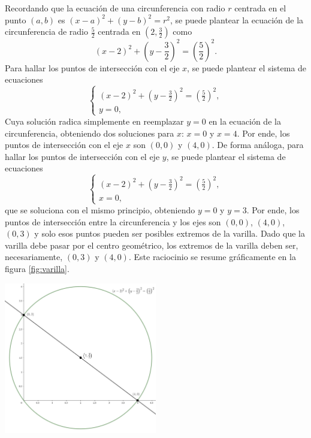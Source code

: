 \documentclass{fmbvecto}
\begin{document}
\begin{problema}
Recordando que la ecuación de una circunferencia con radio \(r\) centrada en el punto \((a, b)\) es \((x - a)^2 + (y - b)^2 = r^2\), se puede plantear la ecuación de la circunferencia de radio \(\frac{5}{2}\) centrada en \((2, \frac{3}{2})\) como
\[(x - 2)^2 + \left(y - \frac{3}{2}\right)^2 = \left(\frac{5}{2}\right)^2.\]
Para hallar los puntos de intersección con el eje \(x\), se puede plantear el sistema de ecuaciones
\[\begin{cases}
    (x - 2)^2 + \left(y - \frac{3}{2}\right)^2 = \left(\frac{5}{2}\right)^2, \\
    y = 0,
\end{cases}\]
Cuya solución radica simplemente en reemplazar \(y = 0\) en la ecuación de la circunferencia, obteniendo dos soluciones para \(x\): \(x = 0\) y \(x = 4\). Por ende, los puntos de intersección con el eje \(x\) son \((0, 0)\) y \((4, 0)\). De forma análoga, para hallar los puntos de intersección con el eje \(y\), se puede plantear el sistema de ecuaciones
\[\begin{cases}
    (x - 2)^2 + \left(y - \frac{3}{2}\right)^2 = \left(\frac{5}{2}\right)^2, \\
    x = 0,
\end{cases}\]
que se soluciona con el mismo principio, obteniendo \(y = 0\) y \(y = 3\). Por ende, los puntos de intersección entre la circunferencia y los ejes son \((0, 0)\), \((4, 0)\), \((0, 3)\) y solo esos puntos pueden ser posibles extremos de la varilla. Dado que la varilla debe pasar por el centro geométrico, los extremos de la varilla deben ser, necesariamente, \((0, 3)\) y \((4, 0)\). Este raciocinio se resume gráficamente en la figura \ref{fig:varilla}.\\

\begin{center}
    \includegraphics[width=0.5\textwidth]{varilla.png}
    \label{fig:varilla}
\end{center}
\vspace*{1em}


\end{problema}
\end{document}
